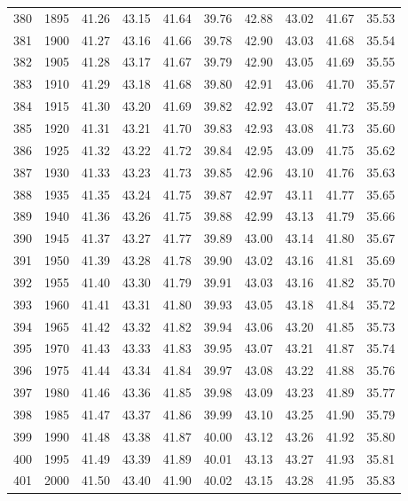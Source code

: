 \begin{longtable}{rrllllllll}
380 & 1895 & 41.26 & 43.15 & 41.64 & 39.76 & 42.88 & 43.02 & 41.67 & 35.53 \\ 
381 & 1900 & 41.27 & 43.16 & 41.66 & 39.78 & 42.90 & 43.03 & 41.68 & 35.54 \\ 
382 & 1905 & 41.28 & 43.17 & 41.67 & 39.79 & 42.90 & 43.05 & 41.69 & 35.55 \\ 
383 & 1910 & 41.29 & 43.18 & 41.68 & 39.80 & 42.91 & 43.06 & 41.70 & 35.57 \\ 
384 & 1915 & 41.30 & 43.20 & 41.69 & 39.82 & 42.92 & 43.07 & 41.72 & 35.59 \\ 
385 & 1920 & 41.31 & 43.21 & 41.70 & 39.83 & 42.93 & 43.08 & 41.73 & 35.60 \\ 
386 & 1925 & 41.32 & 43.22 & 41.72 & 39.84 & 42.95 & 43.09 & 41.75 & 35.62 \\ 
387 & 1930 & 41.33 & 43.23 & 41.73 & 39.85 & 42.96 & 43.10 & 41.76 & 35.63 \\ 
388 & 1935 & 41.35 & 43.24 & 41.75 & 39.87 & 42.97 & 43.11 & 41.77 & 35.65 \\ 
389 & 1940 & 41.36 & 43.26 & 41.75 & 39.88 & 42.99 & 43.13 & 41.79 & 35.66 \\ 
390 & 1945 & 41.37 & 43.27 & 41.77 & 39.89 & 43.00 & 43.14 & 41.80 & 35.67 \\ 
391 & 1950 & 41.39 & 43.28 & 41.78 & 39.90 & 43.02 & 43.16 & 41.81 & 35.69 \\ 
392 & 1955 & 41.40 & 43.30 & 41.79 & 39.91 & 43.03 & 43.16 & 41.82 & 35.70 \\ 
393 & 1960 & 41.41 & 43.31 & 41.80 & 39.93 & 43.05 & 43.18 & 41.84 & 35.72 \\ 
394 & 1965 & 41.42 & 43.32 & 41.82 & 39.94 & 43.06 & 43.20 & 41.85 & 35.73 \\ 
395 & 1970 & 41.43 & 43.33 & 41.83 & 39.95 & 43.07 & 43.21 & 41.87 & 35.74 \\ 
396 & 1975 & 41.44 & 43.34 & 41.84 & 39.97 & 43.08 & 43.22 & 41.88 & 35.76 \\ 
397 & 1980 & 41.46 & 43.36 & 41.85 & 39.98 & 43.09 & 43.23 & 41.89 & 35.77 \\ 
398 & 1985 & 41.47 & 43.37 & 41.86 & 39.99 & 43.10 & 43.25 & 41.90 & 35.79 \\ 
399 & 1990 & 41.48 & 43.38 & 41.87 & 40.00 & 43.12 & 43.26 & 41.92 & 35.80 \\ 
400 & 1995 & 41.49 & 43.39 & 41.89 & 40.01 & 43.13 & 43.27 & 41.93 & 35.81 \\ 
401 & 2000 & 41.50 & 43.40 & 41.90 & 40.02 & 43.15 & 43.28 & 41.95 & 35.83 \\ 

\end{longtable}
